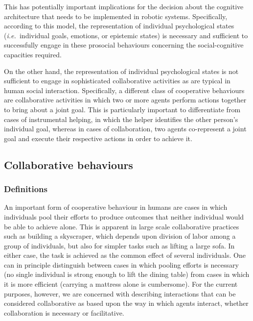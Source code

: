 \documentclass{article}
\newcommand{\ie}{{\textit{i.e.~}}}
\begin{document}
This has potentially important implications for the decision about the
cognitive architecture that needs to be implemented in robotic systems.
Specifically, according to this model, the representation of individual
psychological states (\ie individual goals, emotions, or epistemic states) is
necessary and sufficient to successfully engage in these prosocial behaviours
concerning the social-cognitive capacities required. 

On the other hand, the representation of individual psychological states is not
sufficient to engage in sophisticated collaborative activities as are typical
in human social interaction. Specifically, a different class of cooperative
behaviours are collaborative activities in which two or more agents perform
actions together to bring about a joint goal. This is particularly important to
differentiate from cases of instrumental helping, in which the helper
identifies the other person's individual goal, whereas in cases of
collaboration, two agents co-represent a joint goal and execute their
respective actions in order to achieve it. 

\subsection{Collaborative behaviours}

\subsubsection{Definitions}

An important form of cooperative behaviour in humans are cases in which
individuals pool their efforts to produce outcomes that neither individual
would be able to achieve alone. This is apparent in large scale collaborative
practices such as building a skyscraper, which depends upon division of labor
among a group of individuals, but also for simpler tasks such as lifting a
large sofa. In either case, the task is achieved as the common effect of
several individuals. One can in principle distinguish between cases in which
pooling efforts is necessary (no single individual is strong enough to lift the
dining table) from cases in which it is more efficient (carrying a mattress
alone is cumbersome). For the current purposes, however, we are concerned with
describing interactions that can be considered collaborative as based upon the
way in which agents interact, whether collaboration is necessary or
facilitative.
\end{document}
